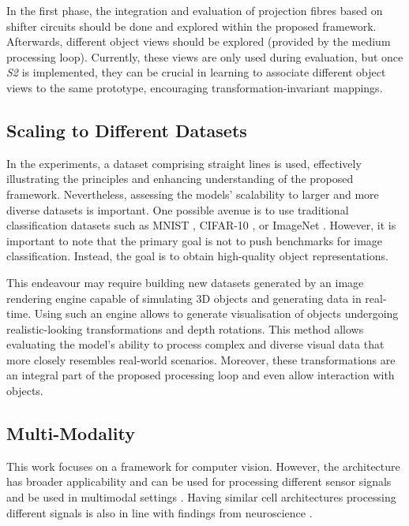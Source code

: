 In the first phase, the integration and evaluation of projection fibres based on shifter circuits  should be done and explored within the proposed framework.
Afterwards, different object views should be explored (provided by the medium processing loop). Currently, these views are only used during evaluation, but once \emph{S2} is implemented, they can be crucial in learning to associate different object views to the same prototype, encouraging transformation-invariant mappings.


\subsection{Scaling to Different Datasets}
In the experiments, a dataset comprising straight lines is used, effectively illustrating the principles and enhancing understanding of the proposed framework.
Nevertheless, assessing the models' scalability to larger and more diverse datasets is important.
One possible avenue is to use traditional classification datasets such as MNIST , CIFAR-10 , or ImageNet .
However, it is important to note that the primary goal is not to push benchmarks for image classification.
Instead, the goal is to obtain high-quality object representations.

This endeavour may require building new datasets generated by an image rendering engine capable of simulating 3D objects and generating data in real-time.
Using such an engine allows to generate visualisation of objects undergoing realistic-looking transformations and depth rotations.
This method allows evaluating the model's ability to process complex and diverse visual data that more closely resembles real-world scenarios.
Moreover, these transformations are an integral part of the proposed processing loop and even allow interaction with objects.



\subsection{Multi-Modality}
This work focuses on a framework for computer vision. However, the architecture has broader applicability and can be used for processing different sensor signals and be used in multimodal settings .
Having similar cell architectures processing different signals is also in line with findings from neuroscience .


